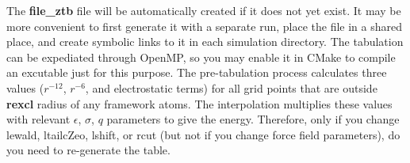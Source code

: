 \documentclass[12pt,letterpaper]{article}
\begin{document}
The \textbf{file\_ztb} file will be automatically created if
it does not yet exist. It may be more convenient to first
generate it with a separate run, place the file in a shared
place, and create symbolic links to it in each simulation
directory. The tabulation can be expediated through OpenMP,
so you may enable it in CMake to compile an excutable just
for this purpose. The pre-tabulation process calculates
three values ($r^{-12}$, $r^{-6}$, and electrostatic terms)
for all grid points that are outside \textbf{rexcl} radius
of any framework atoms. The interpolation multiplies these
values with relevant $\epsilon$, $\sigma$, $q$ parameters to
give the energy. Therefore, only if you change lewald,
ltailcZeo, lshift, or rcut (but not if you change force
field parameters), do you need to re-generate the table.
\end{document}
